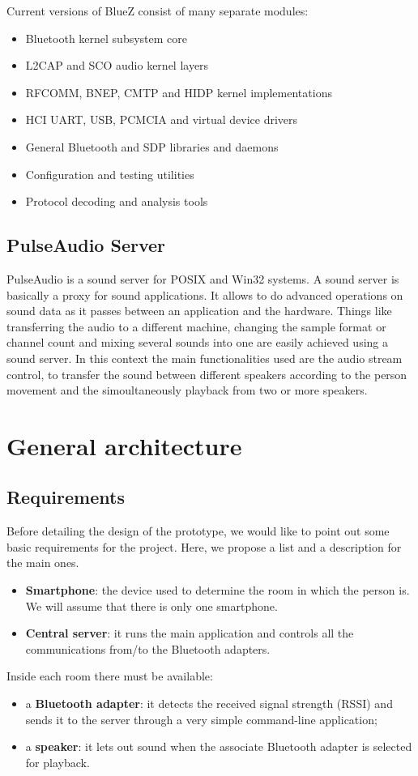 \documentclass[conference]{IEEEtran}
\begin{document}
Current versions of BlueZ consist of many separate modules:
\begin{itemize}
\item Bluetooth kernel subsystem core
\item L2CAP and SCO audio kernel layers
\item RFCOMM, BNEP, CMTP and HIDP kernel implementations
\item HCI UART, USB, PCMCIA and virtual device drivers
\item General Bluetooth and SDP libraries and daemons
\item Configuration and testing utilities
\item Protocol decoding and analysis tools
\end{itemize}




\subsection{PulseAudio Server}
PulseAudio is a sound server for POSIX and Win32 systems. A sound server is basically a proxy for sound applications. It allows to do advanced operations on sound data as it passes between an application and the hardware. Things like transferring the audio to a different machine, changing the sample format or channel count and mixing several sounds into one are easily achieved using a sound server. In this context the main functionalities used are the audio stream control, to transfer the sound between different speakers according to the person movement and the simoultaneously playback from two or more speakers.

\section{General architecture}

\subsection{Requirements}
Before detailing the design of the prototype, we would like to point out some basic requirements for the project. Here, we propose a list and a description for the main ones.
\begin{itemize}
\item{\textbf{Smartphone}:} the device used to determine the room in which the person is. We will assume that there is only one smartphone.
\item{\textbf{Central server}:} it runs the main application and controls all the communications from/to the Bluetooth adapters.
\end{itemize}
Inside each room there must be available:
\begin{itemize}
\item{a \textbf{Bluetooth adapter}:} it detects the received signal strength (RSSI) and sends it to the server through a very simple command-line application;
\item{a \textbf{speaker}:} it lets out sound when the associate Bluetooth adapter is selected for playback.
\end{itemize}
\end{document}
